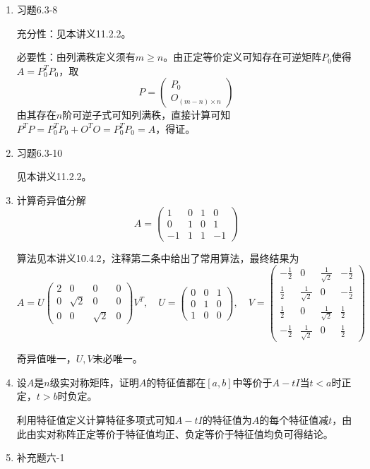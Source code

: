 \documentclass[a4paper,UTF8,fontset=windows]{ctexart}
\newcommand*{\note}{\noindent *}
\begin{document}
\begin{enumerate}
    \item 习题6.3-8
    
    充分性：见本讲义11.2.2。

    必要性：由列满秩定义须有$m\ge n$。由正定等价定义可知存在可逆矩阵$P_0$使得$A=P_0^TP_0$，取
    $$P=\begin{pmatrix}P_0\\O_{(m-n)\times n}\end{pmatrix}$$
    由其存在$n$阶可逆子式可知列满秩，直接计算可知$P^TP=P_0^TP_0+O^TO=P_0^TP_0=A$，得证。

    \item 习题6.3-10
    
    见本讲义11.2.2。

    \item 计算奇异值分解
    $$A=\begin{pmatrix}1&0&1&0\\0&1&0&1\\-1&1&1&-1\end{pmatrix}$$

    算法见本讲义10.4.2，注释第二条中给出了常用算法，最终结果为
    $$A=U\begin{pmatrix}2&0&0&0\\0&\sqrt2&0&0\\0&0&\sqrt2&0\end{pmatrix}V^T,\quad U=\begin{pmatrix}0&0&1\\0&1&0\\1&0&0\end{pmatrix},\quad V=\begin{pmatrix}-\frac{1}{2}&0&\frac{1}{\sqrt{2}}&-\frac{1}{2}\\\frac{1}{2}&\frac{1}{\sqrt{2}}&0&-\frac{1}{2}\\\frac{1}{2}&0&\frac{1}{\sqrt{2}}&\frac{1}{2}\\-\frac{1}{2}&\frac{1}{\sqrt{2}}&0&\frac{1}{2}\end{pmatrix}$$

    \note 奇异值唯一，$U,V$未必唯一。

    \item 设$A$是$n$级实对称矩阵，证明$A$的特征值都在$[a,b]$中等价于$A-tI$当$t<a$时正定，$t>b$时负定。
    
    利用特征值定义计算特征多项式可知$A-tI$的特征值为$A$的每个特征值减$t$，由此由实对称阵正定等价于特征值均正、负定等价于特征值均负可得结论。

    \item 补充题六-1
    

\end{enumerate}
\end{document}
